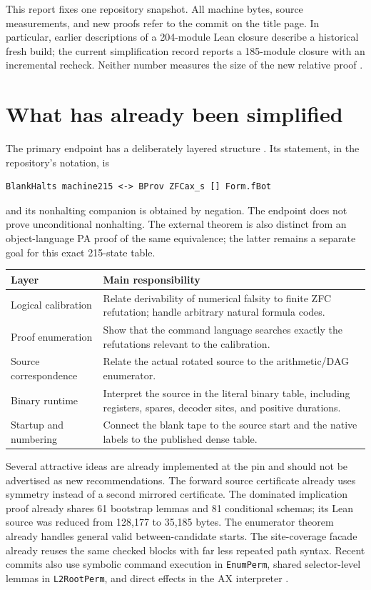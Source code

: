 \documentclass[11pt,letterpaper]{article}
\theoremstyle{definition}\newtheorem{definition}[theorem]{Definition}
\theoremstyle{remark}\newtheorem{remark}[theorem]{Remark}
\begin{document}
This report fixes one repository snapshot. All machine bytes, source
measurements, and new proofs
refer to the commit on the title page. In particular, earlier descriptions
of a 204-module Lean closure describe a historical fresh build; the current
simplification record reports a 185-module closure with an incremental
recheck. Neither number measures the size of the new relative proof
\cite{verification,phase3}.

\section{What has already been simplified}

The primary endpoint has a deliberately layered structure
\cite{endpoint,formal}. Its statement, in the repository's notation, is
\begin{lstlisting}
BlankHalts machine215 <-> BProv ZFCax_s [] Form.fBot
\end{lstlisting}
and its nonhalting companion is obtained by negation. The endpoint does not
prove unconditional nonhalting. The external theorem is also distinct from
an object-language PA proof of the same equivalence; the latter remains a
separate goal for this exact 215-state table.

\begin{tabularx}{\textwidth}{@{}p{}Y@{}}
\toprule
Layer & Main responsibility\\\midrule
Logical calibration & Relate derivability of numerical falsity to finite ZFC refutation; handle arbitrary natural formula codes.\\
Proof enumeration & Show that the command language searches exactly the refutations relevant to the calibration.\\
Source correspondence & Relate the actual rotated source to the arithmetic/DAG enumerator.\\
Binary runtime & Interpret the source in the literal binary table, including registers, spares, decoder sites, and positive durations.\\
Startup and numbering & Connect the blank tape to the source start and the native labels to the published dense table.\\
\bottomrule
\end{tabularx}

Several attractive ideas are already implemented at the pin and should not
be advertised as new recommendations. The forward source certificate already
uses symmetry instead of a second mirrored certificate. The dominated
implication proof already shares 61 bootstrap lemmas and 81 conditional
schemas; its Lean source was reduced from 128,177 to 35,185 bytes. The
enumerator theorem already handles general valid between-candidate starts.
The site-coverage facade already reuses the same checked blocks with far
less repeated path syntax. Recent commits also use symbolic command
execution in \texttt{EnumPerm}, shared selector-level lemmas in
\texttt{L2RootPerm}, and direct effects in the AX interpreter
\cite{phase3,recent}.
\end{document}
